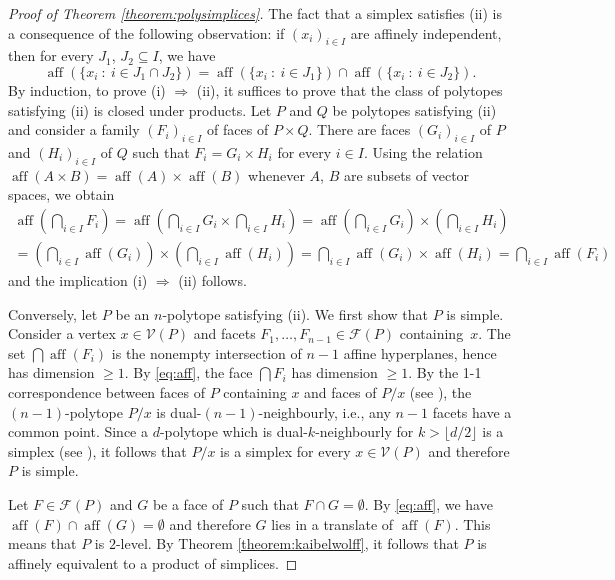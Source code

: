 \documentclass{amsart}
\newcommand{\st}{\ : \ }
\renewcommand{\geq}{\geqslant}
\renewcommand{\subset}{\subseteq}
\DeclareMathOperator{\aff}{\mathrm{aff}}
\theoremstyle{plain}
\begin{document}
\begin{proof}[Proof of Theorem \ref{theorem:polysimplices}]
The fact that a simplex satisfies (ii) is a consequence of the following observation: if $(x_i)_{i \in I}$ are affinely independent, then for every $J_1$, $J_2 \subset I$, we have
\[ \aff(\{x_i \st i \in J_1 \cap J_2\}) = \aff(\{x_i \st i \in J_1\}) \cap \aff(\{x_i \st i \in J_2\}). \]
By induction, to prove (i) $\Longrightarrow$ (ii), it suffices to prove that the class of polytopes satisfying (ii) is closed under products. Let $P$ and $Q$ be polytopes satisfying (ii) and consider a family $(F_i)_{i \in I}$ of faces of $P \times Q$. There are faces $(G_i)_{i \in I}$ of $P$ and $(H_i)_{i \in I}$ of $Q$ such that $F_i=G_i\times H_i$ for every $i \in I$. Using the relation $\aff(A \times B) = \aff(A) \times \aff(B)$ whenever $A$, $B$ are subsets of vector spaces, we obtain
\begin{multline*}
\aff \left(\bigcap_{i \in I} F_i \right)  =  \aff \left( \bigcap_{i\in I} G_i \times \bigcap_{i\in I} H_i \right)   =  \aff \left( \bigcap_{i\in I} G_i \right) \times \left( \bigcap_{i\in I} H_i \right) \\
 = \left(\bigcap_{i \in I} \aff(G_i) \right) \times \left( \bigcap_{i \in I} \aff(H_i) \right)  = \bigcap_{i \in I} \aff(G_i) \times \aff(H_i) = \bigcap_{i \in I} \aff(F_i)
\end{multline*}
and the implication (i) $\Longrightarrow$ (ii) follows.

Conversely, let $P$ be an $n$-polytope satisfying (ii). We first show that $P$ is simple. Consider a vertex $x \in \mathcal{V}(P)$ and facets $F_1,\dots,F_{n-1} \in \mathcal{F}(P)$ containing~$x$. The set $\bigcap \aff(F_i)$ is the nonempty intersection of $n-1$ affine hyperplanes, hence has dimension $\geq 1$. By \eqref{eq:aff}, the face $\bigcap F_i$ has dimension $\geq 1$. By the 1-1 correspondence between faces of $P$ containing $x$ and faces of $P/x$ (see \cite[Proposition 2.4]{Grunbaum}), the $(n-1)$-polytope $P/x$ is dual-$(n-1)$-neighbourly, i.e., any $n-1$ facets have a common point. Since a $d$-polytope which is dual-$k$-neighbourly for $k> \lfloor d/2 \rfloor$ is a simplex (see \cite[p.~123]{Grunbaum}), it follows that $P/x$ is a simplex for every $x \in \mathcal{V}(P)$ and therefore $P$ is simple.

Let $F \in \mathcal{F}(P)$ and $G$ be a face of $P$ such that $F \cap G = \emptyset$. By \eqref{eq:aff}, we have $\aff(F) \cap \aff(G) = \emptyset$ and therefore $G$ lies in a translate of $\aff(F)$. This means that $P$ is $2$-level. By Theorem \ref{theorem:kaibelwolff}, it follows that $P$ is affinely equivalent to a product of simplices.
\end{proof}
\end{document}
